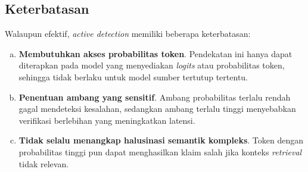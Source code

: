 \subsection{Keterbatasan}

Walaupun efektif, \textit{active detection} memiliki beberapa keterbatasan:

\begin{enumerate}[a.]
    \item \textbf{Membutuhkan akses probabilitas token}.
    Pendekatan ini hanya dapat diterapkan pada model yang menyediakan \textit{logits} atau probabilitas token, sehingga tidak berlaku untuk model sumber tertutup tertentu.

    \item \textbf{Penentuan ambang yang sensitif}.
    Ambang probabilitas terlalu rendah gagal mendeteksi kesalahan, sedangkan ambang terlalu tinggi menyebabkan verifikasi berlebihan yang meningkatkan latensi.

    \item \textbf{Tidak selalu menangkap halusinasi semantik kompleks}.
    Token dengan probabilitas tinggi pun dapat menghasilkan klaim salah jika konteks \textit{retrieval} tidak relevan.
\end{enumerate}





